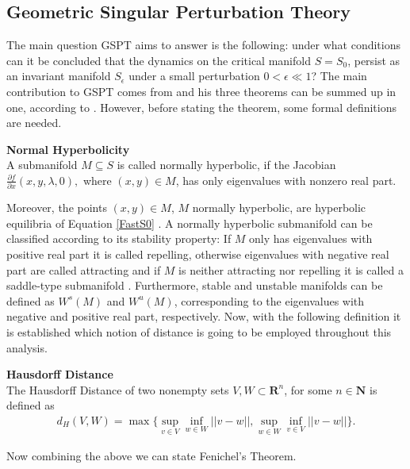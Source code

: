 \subsection{Geometric Singular Perturbation Theory}	
The main question GSPT aims to answer is the following: under what conditions can it be concluded that the dynamics on the critical manifold $S=S_0$, persist as an invariant manifold $S_{\epsilon}$ under a small perturbation $0<\epsilon\ll 1$? The main contribution to GSPT comes from \citet{Fenichel}  and his three theorems can be summed up in one, according to \citet{MMO}. However, before stating the theorem, some formal definitions are needed.

\begin{definition}{\textbf{Normal Hyperbolicity \citep{firstpaper}}} \label{NormHyp}
	\\
	A submanifold $M \subseteq S$ is called normally hyperbolic, if the Jacobian $ \frac{\partial f}{\partial x}(x,y, \lambda, 0),$ where $(x,y) \in M$, has only eigenvalues with nonzero real part.
\end{definition} 

Moreover, the points $(x,y) \in M$, $M$ normally hyperbolic, are hyperbolic equilibria of Equation \ref{FastS0} \citep{MMO}.
A normally hyperbolic submanifold can be classified according to its stability property: If $M$ only has eigenvalues with positive real part it is called repelling, otherwise eigenvalues with negative real part are called attracting and if $M$ is neither attracting nor repelling it is called a saddle-type submanifold \citep{MMO}. Furthermore, stable and unstable manifolds can be defined as $W^s(M)$  and $W^u(M)$, corresponding to the eigenvalues with negative and positive real part, respectively. Now, with the following definition it is established which notion of distance is going to be employed throughout this analysis.

\begin{definition}{\textbf{Hausdorff Distance \citep{Kuehn}}}\\
	The Hausdorff Distance of two nonempty sets $V,W \subset \mathbf{R}^n$, for some $n \in \mathbf{N}$ 
	is defined as 
	\begin{align*}
	d_H(V,W)= \max \{ \sup_{v \in V} \inf_{w \in W} || v- w ||, \sup_ {w \in W}\inf_{v \in V} || v- w ||\}.
	\end{align*}
\end{definition}

Now combining the above we can state Fenichel's Theorem.


